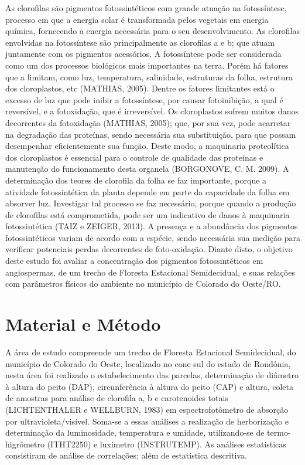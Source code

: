 \documentclass[article,12pt,onesidea,4paper,english,brazil]{abntex2}
\begin{document}
	As clorofilas são pigmentos fotossintéticos com grande atuação na fotossíntese, processo em que a energia solar é transformada pelos vegetais em energia química, fornecendo a energia necessária para o seu desenvolvimento. As clorofilas envolvidas na fotossíntese são principalmente as clorofilas a e b; que atuam juntamente com os pigmentos acessórios.
	A fotossíntese pode ser considerada como um dos processos biológicos mais importantes na terra. Porém há fatores que a limitam, como luz, temperatura, salinidade, estruturas da folha, estrutura dos cloroplastos, etc (MATHIAS, 2005). Dentre os fatores limitantes está o excesso de luz que pode inibir a fotossíntese, por causar fotoinibição, a qual é reversível, e a fotoxidação, que é irreversível.
	Os cloroplastos sofrem muitos danos decorrentes da fotoxidação (MATHIAS, 2005); que, por sua vez, pode acarretar na degradação das proteínas, sendo necessária sua substituição, para que possam desempenhar eficientemente sua função. Deste modo, a maquinaria proteolítica dos cloroplastos é essencial para o controle de qualidade das proteínas e manutenção do funcionamento desta organela (BORGONOVE, C. M. 2009).
	A determinação dos teores de clorofila da folha se faz importante, porque a atividade fotossintética da planta depende em parte da capacidade da folha em absorver luz. Investigar tal processo se faz necessário, porque quando a produção de clorofilas está comprometida, pode ser um indicativo de danos à maquinaria fotossintética (TAIZ e ZEIGER, 2013).
	A presença e a abundância dos pigmentos fotossintéticos variam de acordo com a espécie, sendo necessária sua medição para verificar potenciais perdas decorrentes de foto-oxidação. Diante disto, o objetivo deste estudo foi avaliar a concentração dos pigmentos fotossintéticos em angiospermas, de um trecho de Floresta Estacional Semidecidual, e suas relações com parâmetros físicos do ambiente no município de Colorado do Oeste/RO.
	
	\section*{Material e Método}
	
	A área de estudo compreende um trecho de Floresta Estacional Semidecidual, do município de Colorado do Oeste, localizado no cone sul do estado de Rondônia, nesta área foi realizado o estabelecimento das parcelas, determinação de diâmetro à altura do peito (DAP), circunferência à altura do peito (CAP) e altura, coleta de amostras para análise de clorofila a, b e carotenoides totais (LICHTENTHALER e WELLBURN, 1983) em espectrofotômetro de absorção por ultravioleta/visível. Soma-se a essas análises a realização de herborização e determinação da luminosidade, temperatura e umidade, utilizando-se de termo- higrômetro (ITHT2250) e luxímetro (INSTRUTEMP). As análises estatísticas consistiram de análise de correlações; além de estatística descritiva.
	
\end{document}
